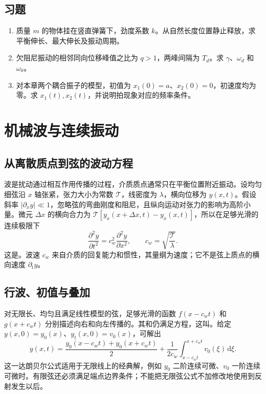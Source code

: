 \documentclass[UTF8,12pt,a4paper,fontset=fandol]{ctexbook}
\begin{document}
\section{习题}
\begin{enumerate}[label=\thechapter.\arabic*,ref=\thechapter.\arabic*]
\item\label{exr:mech-spring-vertical} 质量 $m$ 的物体挂在竖直弹簧下，劲度系数 $k$。从自然长度位置静止释放，求平衡伸长、最大伸长及振动周期。
\item\label{exr:mech-log-decrement} 欠阻尼振动的相邻同向位移峰值之比为 $q>1$，两峰间隔为 $T_d$。求 $\gamma$、$\omega_d$ 和 $\omega_0$。
\item\label{exr:mech-modes} 对本章两个耦合振子的模型，初值为 $x_1(0)=a$、$x_2(0)=0$，初速度均为零。求 $x_1(t),x_2(t)$，并说明拍现象对应的频率条件。
\end{enumerate}

\chapter{机械波与连续振动}
\label{chap:mech-waves}

\section{从离散质点到弦的波动方程}
波是扰动通过相互作用传播的过程，介质质点通常只在平衡位置附近振动。设均匀细弦沿 $x$ 轴张紧，张力大小为常数 $\mathcal T$，线密度为 $\lambda$，横向位移为 $y(x,t)$。假设斜率 $|\partial_xy|\ll1$，忽略弦的弯曲刚度和阻尼，且纵向运动对张力的影响为高阶小量。微元 $\Delta x$ 的横向合力为 $\mathcal T[y_x(x+\Delta x,t)-y_x(x,t)]$，所以在足够光滑的连续极限下
\begin{equation}
 \frac{\partial^2y}{\partial t^2}=c_w^2\frac{\partial^2y}{\partial x^2},\qquad
 c_w=\sqrt{\frac{\mathcal T}{\lambda}}.
 \label{eq:mech-wave}
\end{equation}
这是。波速 $c_w$ 来自介质的回复能力和惯性，其量纲为速度；它不是弦上质点的横向速度 $\partial_ty$。

\section{行波、初值与叠加}
对无限长、均匀且满足线性模型的弦，足够光滑的函数 $f(x-c_wt)$ 和 $g(x+c_wt)$ 分别描述向右和向左传播的。其和仍满足方程，这叫。给定 $y(x,0)=y_0(x)$、$y_t(x,0)=v_0(x)$，可解出
\begin{equation}
 y(x,t)=\frac{y_0(x-c_wt)+y_0(x+c_wt)}2
 +\frac1{2c_w}\int_{x-c_wt}^{x+c_wt}v_0(\xi)\,\mathrm d\xi.
 \label{eq:mech-dalembert}
\end{equation}
这一达朗贝尔公式适用于无限线上的经典解，例如 $y_0$ 二阶连续可微、$v_0$ 一阶连续可微时。有限弦还必须满足端点边界条件；不能把无限弦公式不加修改地使用到反射发生以后。
\end{document}
